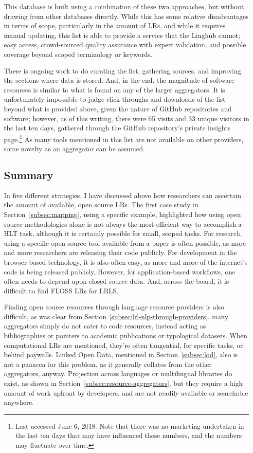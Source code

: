 This database is built using a combination of these two approaches, but without drawing from other databases directly. While this has some relative disadvantages in terms of scope, particularly in the amount of LRs, and while it requires manual updating, this list is able to provide a service that the Linghub cannot; easy access, crowd-sourced quality assurance with expert validation, and possible coverage beyond scoped terminology or keywords.

There is ongoing work to do curating the list, gathering sources, and improving the sections where data is stored. And, in the end, the magnitude of software resources is similar to what is found on any of the larger aggregators. It is unfortunately impossible to judge click-throughs and downloads of the list beyond what is provided above, given the nature of GitHub repositories and software; however, as of this writing, there were 65 visits and 33 unique visitors in the last ten days, gathered through the GitHub repository's private insights page.\footnote{Last accessed June 6, 2018. Note that there was no marketing undertaken in the last ten days that may have influenced these numbers, and the numbers may fluctuate over time.} As many tools mentioned in this list are not available on other providers, some novelty as an aggregator can be assumed.

\subsection{Summary}
\label{subsec:lrl-summary}

In five different strategies, I have discussed above how researchers can ascertain the amount of available, open source LRs. The first case study in Section~\ref{subsec:mapping}, using a specific example, highlighted how using open source methodologies alone is not always the most efficient way to accomplish a HLT task, although it is certainly possible for small, scoped tasks. For research, using a specific open source tool available from a paper is often possible, as more and more researchers are releasing their code publicly. For development in the browser-based technology, it is also often easy, as more and more of the internet's code is being released publicly. However, for application-based workflows, one often needs to depend upon closed source data. And, across the board, it is difficult to find FLOSS LRs for LRLS.

Finding open source resources through language resource providers is also difficult, as was clear from Section~\ref{subsec:lrl-nlp-through-providers}. many aggregators simply do not cater to code resources, instead acting as bibliographies or pointers to academic publications or typological datasets. When computational LRs are mentioned, they're often tangential, for specific tasks, or behind paywalls. Linked Open Data, mentioned in Section~\ref{subsec:lod}, also is not a panacea for this problem, as it generally collates from the other aggregators, anyway. Projection across languages or multilingual libraries do exist, as shown in Section~\ref{subsec:resource-aggregators}, but they require a high amount of work upfront by developers, and are not readily available or searchable anywhere.


